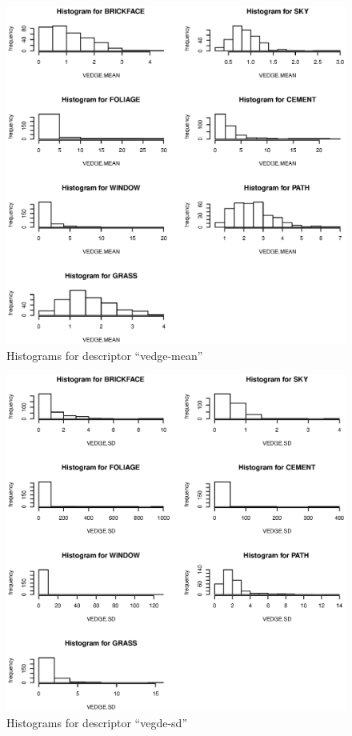 \documentclass{article}
\begin{document}
\begin{figure}[htp]
\centering
\includegraphics[width=12cm]{a6.eps}
\caption{Histograms for descriptor ``vedge-mean''}
\end{figure}

\begin{figure}[htp]
\centering
\includegraphics[width=12cm]{a7.eps}
\caption{Histograms for descriptor ``vegde-sd''}
\end{figure}
\end{document}

